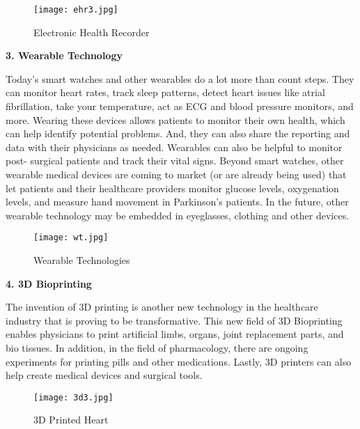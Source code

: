 \documentclass[12pt,a4paper]{article}
\begin{document}
\begin{figure}[h]
\centering
\texttt{[image: ehr3.jpg]}
\caption{Electronic Health Recorder}
\end{figure}


\clearpage

\textbf{3. Wearable Technology}

\hspace{1cm}

Today's smart watches and other wearables do  a lot more than count steps. They can monitor heart rates, track sleep patterns, detect heart issues like atrial fibrillation, take your temperature, act as ECG and blood pressure monitors, and more. Wearing these devices allows patients to monitor their own health, which can help identify potential problems. And, they can also share the reporting and data with their physicians as needed. Wearables can also be helpful to monitor post- surgical patients and track their vital signs. Beyond smart watches, other wearable medical devices are coming to market (or are already being used) that let patients and their healthcare providers monitor glucose levels, oxygenation levels, and measure hand movement in Parkinson's patients. In the future, other wearable technology may be embedded in eyeglasses, clothing and other devices.


\hspace{5cm}


\begin{figure}[h]
\centering
\texttt{[image: wt.jpg]}
\caption{Wearable Technologies}
\end{figure}

\clearpage

\textbf{4. 3D Bioprinting}

\hspace{1cm}

The invention of 3D printing  is another new technology  in the healthcare industry that is proving to be transformative. This new field of 3D Bioprinting enables physicians to print artificial limbs, organs, joint replacement parts, and bio tissues. In addition, in the field of pharmacology, there are ongoing experiments for printing pills and other medications. Lastly, 3D printers can also help create medical devices and surgical tools.

\hspace{5cm}

\begin{figure}[h]
\centering
\texttt{[image: 3d3.jpg]}
\caption{3D Printed Heart}
\end{figure}
\end{document}
